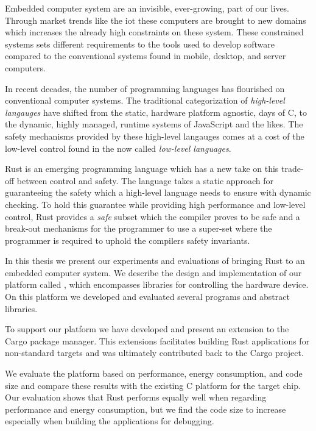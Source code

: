
\label{chap:abstract}

Embedded computer system are an invisible, ever-growing, part of our lives.
Through market trends like the \glsdesc{iot} these computers are brought to new domains which increases the already high constraints on these system.
These constrained systems sets different requirements to the tools used to develop software compared to the conventional systems found in mobile, desktop, and server computers.

In recent decades, the number of programming languages has flourished on conventional computer systems.
The traditional categorization of \emph{high-level langauges} have shifted from the static, hardware platform agnostic, days of C, to the dynamic, highly managed, runtime systems of JavaScript and the likes.
The safety mechanisms provided by these high-level langauges comes at a cost of the low-level control found in the now called \emph{low-level languages}.

Rust is an emerging programming language which has a new take on this trade-off between control and safety.
The language takes a static approach for guaranteeing the safety which a high-level language needs to ensure with dynamic checking.
To hold this guarantee while providing high performance and low-level control, Rust provides a \emph{safe} subset which the compiler proves to be safe and a break-out mechanisms for the programmer to use a super-set where the programmer is required to uphold the compilers safety invariants.

In this thesis we present our experiments and evaluations of bringing Rust to an embedded computer system.
We describe the design and implementation of our  platform called {\rg}, which encompasses libraries for controlling the hardware device.
On this platform we developed and evaluated several programs and abstract libraries.

To support our platform we have developed and present an extension to the Cargo package manager.
This extensions facilitates building Rust applications for non-standard targets and was ultimately contributed back to the Cargo project.

We evaluate the platform based on performance, energy consumption, and code size and compare these results with the existing C platform for the target chip.
Our evaluation shows that Rust performs equally well when regarding performance and energy consumption, but we find the code size to increase especially when building the applications for debugging.
